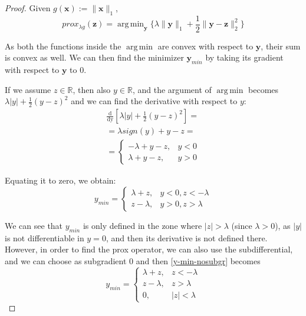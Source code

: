 \documentclass[12pt]{article}
\DeclareMathOperator*{\argmin}{arg\,min}
\begin{document}
\begin{proof}
Given $g(\mathbf{x}) := \lVert \mathbf{x} \rVert_1$,
\begin{equation}
    prox_{\lambda g}(\mathbf{z}) = \argmin_{\mathbf{y}} \{\lambda \lVert \mathbf{y} \rVert_1 + \frac{1}{2} \lVert \mathbf{y} - \mathbf{z} \rVert_2^2 \}
\end{equation}

As both the functions inside the $\argmin$ are convex with respect to $\mathbf{y}$, their sum is convex as well. We can then find the minimizer $\mathbf{y}_{min}$ by taking its gradient with respect to $\mathbf{y}$ to 0.

If we assume $z \in \mathbb{R}$, then also $y \in \mathbb{R}$, and the argument of $\argmin$ becomes $\lambda |y| + \frac{1}{2} (y - z)^2$ and we can find the derivative with respect to $y$:
\begin{gather}
     \frac{\mathrm{d}}{\mathrm{dy}} [\lambda |y| + \frac{1}{2} (y - z)^2] = \\
     = \lambda sign(y) + y - z = \\
     = \begin{cases}
     - \lambda + y - z, & y < 0 \\
     \lambda + y - z, & y > 0
     \end{cases}
\end{gather}

Equating it to zero, we obtain:
\begin{equation} \label{y-min-nosubgr}
     y_{min} = \begin{cases}
     \lambda + z, & y < 0, z < -\lambda \\
     z - \lambda, & y > 0, z > \lambda
     \end{cases}
\end{equation}

We can see that $y_{min}$ is only defined in the zone where $|z| > \lambda$ (since $\lambda > 0$), as $|y|$ is not differentiable in $y = 0$, and then its derivative is not defined there. However, in order to find the prox operator, we can also use the subdifferential, and we can choose as subgradient $0$ and then \eqref{y-min-nosubgr} becomes
\begin{equation} \label{y-min-subgr}
     y_{min} = \begin{cases}
     \lambda + z,   & z < -\lambda \\
     z - \lambda,   & z > \lambda \\
     0,             & |z| < \lambda 
     \end{cases}
\end{equation}


\end{proof}
\end{document}
